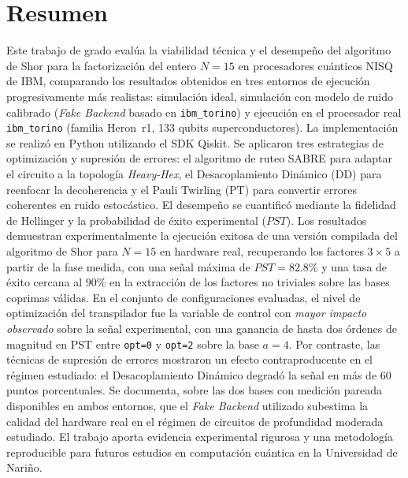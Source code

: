 \documentclass[12pt, spanish]{book}
\begin{document}
\vspace*{\fill}

\chapter*{Resumen}

Este trabajo de grado evalúa la viabilidad técnica y el desempeño del algoritmo de Shor para la factorización del entero \(N = 15\) en procesadores cuánticos NISQ de IBM, comparando los resultados obtenidos en tres entornos de ejecución progresivamente más realistas: simulación ideal, simulación con modelo de ruido calibrado (\textit{Fake Backend} basado en \texttt{ibm\_torino}) y ejecución en el procesador real \texttt{ibm\_torino} (familia Heron~r1, 133 qubits superconductores). La implementación se realizó en Python utilizando el SDK Qiskit. Se aplicaron tres estrategias de optimización y supresión de errores: el algoritmo de ruteo SABRE para adaptar el circuito a la topología \textit{Heavy-Hex}, el Desacoplamiento Dinámico (DD) para reenfocar la decoherencia y el Pauli Twirling (PT) para convertir errores coherentes en ruido estocástico. El desempeño se cuantificó mediante la fidelidad de Hellinger y la probabilidad de éxito experimental (\(PST\)). Los resultados demuestran experimentalmente la ejecución exitosa de una versión compilada del algoritmo de Shor para \(N = 15\) en hardware real, recuperando los factores \(3 \times 5\) a partir de la fase medida, con una señal máxima de \(PST = 82.8\%\) y una tasa de éxito cercana al \(90\%\) en la extracción de los factores no triviales sobre las bases coprimas válidas. En el conjunto de configuraciones evaluadas, el nivel de optimización del transpilador fue la variable de control con \emph{mayor impacto observado} sobre la señal experimental, con una ganancia de hasta dos órdenes de magnitud en PST entre \texttt{opt=0} y \texttt{opt=2} sobre la base $a=4$. Por contraste, las técnicas de supresión de errores mostraron un efecto contraproducente en el régimen estudiado: el Desacoplamiento Dinámico degradó la señal en más de 60 puntos porcentuales. Se documenta, sobre las dos bases con medición pareada disponibles en ambos entornos, que el \textit{Fake Backend} utilizado subestima la calidad del hardware real en el régimen de circuitos de profundidad moderada estudiado. El trabajo aporta evidencia experimental rigurosa y una metodología reproducible para futuros estudios en computación cuántica en la Universidad de Nariño.\\
\end{document}
